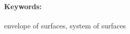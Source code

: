 \documentclass[12pt, twoside]{book}
\theoremstyle{definition}
\begin{document}
\paragraph*{Keywords:} envelope of surfaces, system of surfaces


%
%



\newpage 

\tableofcontents



\newpage 

\listoffigures
\listoftables


\mainmatter


 













\newpage	

\backmatter

\thispagestyle{empty}
\nocite{*}
\clearpage


% 
\end{document}

